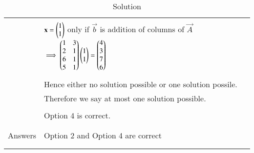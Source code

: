 \documentclass[journal,12pt]{IEEEtran}
\begin{document}
\begin{longtable}{|l|l|}
&\\
&$\mathbf{x}=\begin{pmatrix}1\\1\end{pmatrix}$ only if $\vec{b}$ is addition of columns of $\vec{A}$ $\implies \begin{pmatrix}1&3\\2&1\\6&1\\5&1\end{pmatrix}\begin{pmatrix}1\\1\end{pmatrix}=\begin{pmatrix}4\\3\\7\\6\end{pmatrix}$\\
&\\
&Hence either no solution possible or one solution possile.\\&Therefore we say at most one solution possible.\\
&\\
&Option 4 is correct.\\
&\\
\hline
&\\
Answers & Option 2 and Option 4 are correct\\
&\\
\hline
\caption{Solution}
\label{table:1}
\end{longtable}
\end{document}
